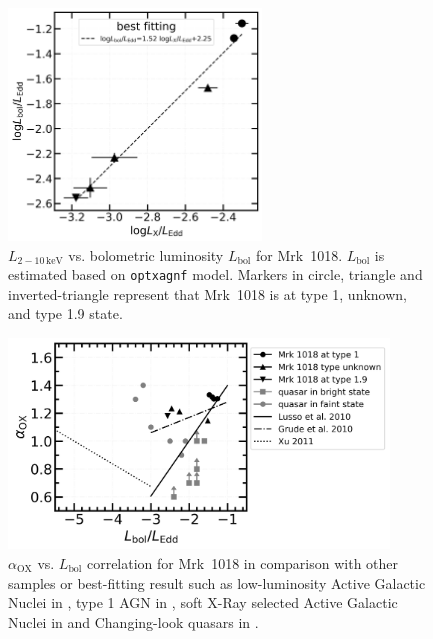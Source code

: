 \documentclass[twocolumn]{aastex63}
\begin{document}
\begin{figure}
\centering
	\includegraphics[width=0.6\textwidth]{./pic/Mrk1018_LxvsLBol_fit.png}
    \caption{$L_\mathrm{2-10\,keV}$ vs. bolometric luminosity $L_\mathrm{bol}$ for Mrk~1018. $L_\mathrm{bol}$ is estimated based on \texttt{optxagnf} model. Markers in circle, triangle and inverted-triangle represent that Mrk~1018 is at type 1, unknown, and type 1.9 state.}
    \label{fig:xray-bol}
\end{figure}



\begin{figure}
\centering
	\includegraphics[width=0.9\textwidth]{./pic/Mrk1018_subplots_plus_alpha_ox_logLbol_rate.png}
    \caption{$\alpha_\mathrm{OX}$ vs. $L_\mathrm{bol}$ correlation for Mrk~1018 in comparison with other samples or best-fitting result such as low-luminosity Active Galactic Nuclei in \citet[][]{2011ApJ...739...64X}, type 1 AGN in \citet{2010A&A...512A..34L}, soft X-Ray selected Active Galactic Nuclei in \citet[][]{2010ApJS..187...64G} and Changing-look quasars in \citet[][]{2019ApJ...883...76R}. }
    \label{fig:alphaox-bol}
\end{figure}
\end{document}
